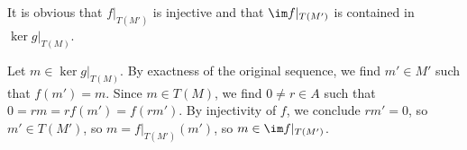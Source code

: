 It is obvious that $f|_{T(M')}$ is injective and that
$\im f|_{T(M')}$ is contained in $\ker g|_{T(M)}$.

Let $m \in \ker g|_{T(M)}$. By exactness of the original sequence, we find
$m' \in M'$ such that $f(m') = m$. Since $m \in T(M)$, we find
$0\neq r \in A$ such that $0 = rm = rf(m') = f(rm')$. By injectivity of
$f$, we conclude $rm' = 0$, so $m' \in T(M')$, so $m = f|_{T(M')}(m')$, so
$m \in \im f|_{T(M')}$.
